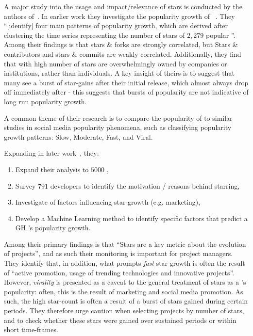 A major study into the usage and impact/relevance of stars is conducted by the authors of~\cite{borges_2018_WhatsGitHub}. In earlier work they investigate the popularity growth of \ghrepo{}~\cite{borges_2016_UnderstandingFactors}.
They ``[identify] four main patterns of popularity growth, which are derived after clustering the time series representing the number of stars of $2,279$ popular \ghrepo{}''.
Among their findings is that stars \& forks are strongly correlated, but Stars \& contributors and stars \& commits are weakly correlated.
Additionally, they find that \repos{} with high number of stars are overwhelmingly owned by companies or institutions, rather than individuals.
A key insight of theirs is to suggest that many \repos{} see a burst of star-gains after their initial release, which almost always drop off immediately after - this suggests that bursts of popularity are not indicative of long run popularity growth.

A common theme of their research is to compare the popularity of \ghrepo{} to similar studies in social media popularity phenomena, such as classifying popularity growth patterns: Slow, Moderate, Fast, and Viral.

Expanding in later work~\cite{borges_2018_WhatsGitHub}, they:

\begin{enumerate}
  \item Expand their analysis to $5000$ \repos{},
  \item Survey $791$ developers to identify the motivation / reasons behind starring,
  \item Investigate of factors influencing star-growth (e.g. marketing),
  \item Develop a Machine Learning method to identify specific factors that predict a GH \repo{}'s popularity growth.
\end{enumerate}

Among their primary findings is that ``Stars are a key metric about the evolution of \gh{} projects'', and as such their monitoring is important for project managers.
They identify that, in addition, what prompts \emph{fast} star growth is often the result of ``active promotion, usage of trending technologies and innovative projects''.
However, \emph{virality} is presented as a caveat to the general treatment of stars as a \repo{}'s popularity: often, this is the result of marketing and social media promotion. As such, the high star-count is often a result of a burst of stars gained during certain periods.
They therefore urge caution when selecting \gh{} projects by number of stars, and to check whether these stars were gained over sustained periods or within short time-frames.


